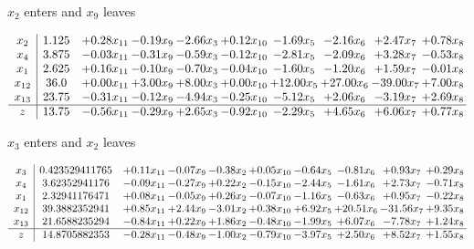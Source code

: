 \documentclass[9pt]{article}
\begin{document}
 $ x_{2} $ enters and $ x_{9} $ leaves 

 \[\begin{array}{c| c c@{\hskip 2pt} c@{\hskip 2pt} c@{\hskip 2pt} c@{\hskip 2pt} c@{\hskip 2pt} c@{\hskip 2pt} c@{\hskip 2pt} c@{\hskip 2pt} }
 x_{2}   &  1.125 & +  0.28 x_{11} & -0.19 x_{9} & -2.66 x_{3} & +  0.12 x_{10} & -1.69 x_{5} & -2.16 x_{6} & +  2.47 x_{7} & +  0.78 x_{8}\\
 x_{4}   &  3.875 & -0.03 x_{11} & -0.31 x_{9} & -0.59 x_{3} & -0.12 x_{10} & -2.81 x_{5} & -2.09 x_{6} & +  3.28 x_{7} & -0.53 x_{8}\\
 x_{1}   &  2.625 & +  0.16 x_{11} & -0.10 x_{9} & -0.70 x_{3} & -0.04 x_{10} & -1.60 x_{5} & -1.20 x_{6} & +  1.59 x_{7} & -0.01 x_{8}\\
 x_{12}   &  36.0 & +  0.00 x_{11} & +  3.00 x_{9} & +  8.00 x_{3} & +  0.00 x_{10} & + 12.00 x_{5} & + 27.00 x_{6} & -39.00 x_{7} & +  7.00 x_{8}\\
 x_{13}   &  23.75 & -0.31 x_{11} & -0.12 x_{9} & -4.94 x_{3} & -0.25 x_{10} & -5.12 x_{5} & +  2.06 x_{6} & -3.19 x_{7} & +  2.69 x_{8}\\
\hline
z    &  13.75 & -0.56 x_{11} & -0.29 x_{9} & +  2.65 x_{3} & -0.92 x_{10} & -2.29 x_{5} & +  4.65 x_{6} & +  6.06 x_{7} & +  0.77 x_{8}\\
\end{array}\]


 $ x_{3} $ enters and $ x_{2} $ leaves 

 \[\begin{array}{c| c c@{\hskip 2pt} c@{\hskip 2pt} c@{\hskip 2pt} c@{\hskip 2pt} c@{\hskip 2pt} c@{\hskip 2pt} c@{\hskip 2pt} c@{\hskip 2pt} }
 x_{3}   &  0.423529411765 & +  0.11 x_{11} & -0.07 x_{9} & -0.38 x_{2} & +  0.05 x_{10} & -0.64 x_{5} & -0.81 x_{6} & +  0.93 x_{7} & +  0.29 x_{8}\\
 x_{4}   &  3.62352941176 & -0.09 x_{11} & -0.27 x_{9} & +  0.22 x_{2} & -0.15 x_{10} & -2.44 x_{5} & -1.61 x_{6} & +  2.73 x_{7} & -0.71 x_{8}\\
 x_{1}   &  2.32941176471 & +  0.08 x_{11} & -0.05 x_{9} & +  0.26 x_{2} & -0.07 x_{10} & -1.16 x_{5} & -0.63 x_{6} & +  0.95 x_{7} & -0.22 x_{8}\\
 x_{12}   &  39.3882352941 & +  0.85 x_{11} & +  2.44 x_{9} & -3.01 x_{2} & +  0.38 x_{10} & +  6.92 x_{5} & + 20.51 x_{6} & -31.56 x_{7} & +  9.35 x_{8}\\
 x_{13}   &  21.6588235294 & -0.84 x_{11} & +  0.22 x_{9} & +  1.86 x_{2} & -0.48 x_{10} & -1.99 x_{5} & +  6.07 x_{6} & -7.78 x_{7} & +  1.24 x_{8}\\
\hline
z    &  14.8705882353 & -0.28 x_{11} & -0.48 x_{9} & -1.00 x_{2} & -0.79 x_{10} & -3.97 x_{5} & +  2.50 x_{6} & +  8.52 x_{7} & +  1.55 x_{8}\\
\end{array}\]
\end{document}
